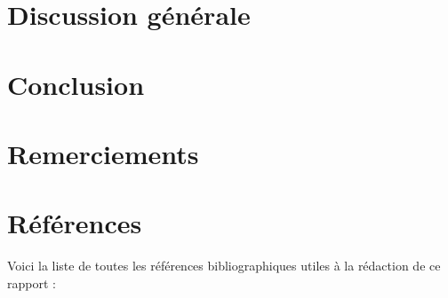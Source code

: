 \documentclass[
  french,
  11pt,
  a4paper,
]{article}
\begin{document}
\section{Discussion générale}\label{discussion-guxe9nuxe9rale}

\newpage

\section*{Conclusion}\label{conclusion}

\newpage

\section*{Remerciements}\label{remerciements}

\newpage

\section*{Références}\label{ruxe9fuxe9rences}

Voici la liste de toutes les références bibliographiques utiles à la
rédaction de ce rapport :
\end{document}
